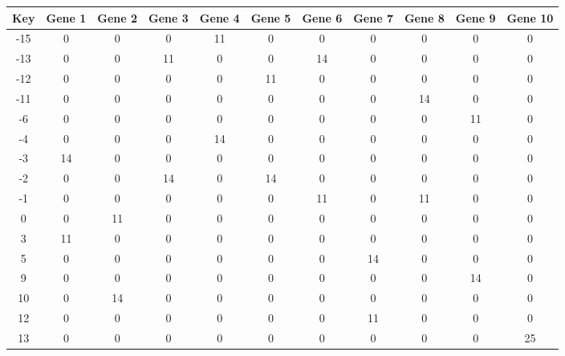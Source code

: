 \begin{tabular}{|c|c|c|c|c|c|c|c|c|c|c|}
\hline
Key & Gene 1 & Gene 2 & Gene 3 & Gene 4 & Gene 5 & Gene 6 & Gene 7 & Gene 8 & Gene 9 & Gene 10 \\
\hline
-15 & 0 & 0 & 0 & 11 & 0 & 0 & 0 & 0 & 0 & 0 \\
-13 & 0 & 0 & 11 & 0 & 0 & 14 & 0 & 0 & 0 & 0 \\
-12 & 0 & 0 & 0 & 0 & 11 & 0 & 0 & 0 & 0 & 0 \\
-11 & 0 & 0 & 0 & 0 & 0 & 0 & 0 & 14 & 0 & 0 \\
-6 & 0 & 0 & 0 & 0 & 0 & 0 & 0 & 0 & 11 & 0 \\
-4 & 0 & 0 & 0 & 14 & 0 & 0 & 0 & 0 & 0 & 0 \\
-3 & 14 & 0 & 0 & 0 & 0 & 0 & 0 & 0 & 0 & 0 \\
-2 & 0 & 0 & 14 & 0 & 14 & 0 & 0 & 0 & 0 & 0 \\
-1 & 0 & 0 & 0 & 0 & 0 & 11 & 0 & 11 & 0 & 0 \\
0 & 0 & 11 & 0 & 0 & 0 & 0 & 0 & 0 & 0 & 0 \\
3 & 11 & 0 & 0 & 0 & 0 & 0 & 0 & 0 & 0 & 0 \\
5 & 0 & 0 & 0 & 0 & 0 & 0 & 14 & 0 & 0 & 0 \\
9 & 0 & 0 & 0 & 0 & 0 & 0 & 0 & 0 & 14 & 0 \\
10 & 0 & 14 & 0 & 0 & 0 & 0 & 0 & 0 & 0 & 0 \\
12 & 0 & 0 & 0 & 0 & 0 & 0 & 11 & 0 & 0 & 0 \\
13 & 0 & 0 & 0 & 0 & 0 & 0 & 0 & 0 & 0 & 25 \\
\hline
\end{tabular}